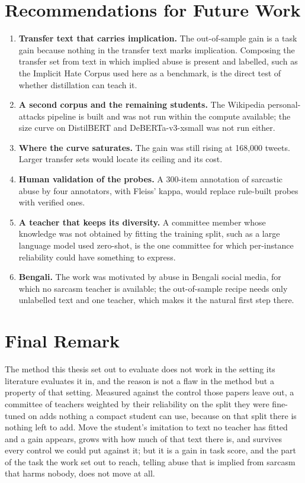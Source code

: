 \section{Recommendations for Future Work}
\label{sec:7.2}
\begin{enumerate}
  \item \textbf{Transfer text that carries implication.} The out-of-sample gain is a task gain because
    nothing in the transfer text marks implication. Composing the transfer set from text in which implied
    abuse is present and labelled, such as the Implicit Hate Corpus used here as a benchmark, is the
    direct test of whether distillation can teach it.
  \item \textbf{A second corpus and the remaining students.} The Wikipedia personal-attacks pipeline is
    built and was not run within the compute available; the size curve on DistilBERT and
    DeBERTa-v3-xsmall was not run either.
  \item \textbf{Where the curve saturates.} The gain was still rising at 168,000 tweets. Larger transfer
    sets would locate its ceiling and its cost.
  \item \textbf{Human validation of the probes.} A 300-item annotation of sarcastic abuse by four
    annotators, with Fleiss' kappa, would replace rule-built probes with verified ones.
  \item \textbf{A teacher that keeps its diversity.} A committee member whose knowledge was not obtained
    by fitting the training split, such as a large language model used zero-shot, is the one committee
    for which per-instance reliability could have something to express.
  \item \textbf{Bengali.} The work was motivated by abuse in Bengali social media, for which no sarcasm
    teacher is available; the out-of-sample recipe needs only unlabelled text and one teacher, which makes
    it the natural first step there.
\end{enumerate}

\section{Final Remark}
\label{sec:6.final}

The method this thesis set out to evaluate does not work in the setting its literature evaluates it
in, and the reason is not a flaw in the method but a property of that setting. Measured against the
control those papers leave out, a committee of teachers weighted by their reliability on the split
they were fine-tuned on adds nothing a compact student can use, because on that split there is nothing
left to add. Move the student's imitation to text no teacher has fitted and a gain appears, grows with
how much of that text there is, and survives every control we could put against it; but it is a gain
in task score, and the part of the task the work set out to reach, telling abuse that is implied from
sarcasm that harms nobody, does not move at all.

